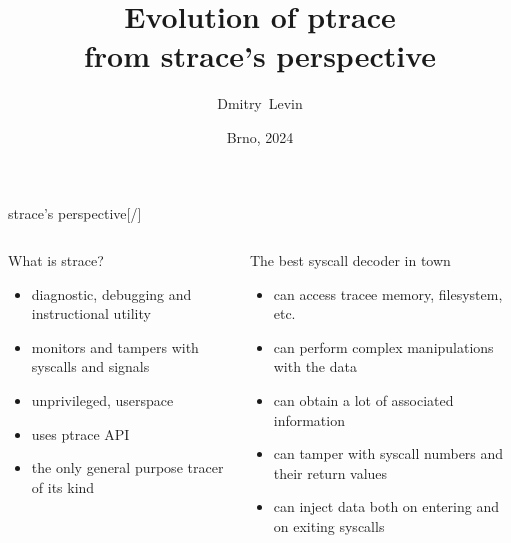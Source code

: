\documentclass[unicode,aspectratio=169,xcolor={table,dvipsnames,usernames}]{beamer}
\title{\Huge Evolution of ptrace \\ from strace's perspective}
\author{\LARGE Dmitry~Levin}
\date{\Large Brno, 2024}
\begin{document}
\begin{frame}[noframenumbering]
\titlepage
\end{frame}

{
\begin{frame}{\Large strace's perspective\hfill [\insertframenumber/\inserttotalframenumber]}
	\begin{columns}
		\column{10cm}
\begin{block}{What is strace?}
\begin{itemize}
	\item diagnostic, debugging and instructional utility
	\item monitors and tampers with syscalls and signals
	\item unprivileged, userspace
	\item uses ptrace API
	\item the only general purpose tracer of its kind
\end{itemize}
\end{block}

\begin{block}{The best syscall decoder in town}
\begin{itemize}
	\item can access tracee memory, filesystem, etc.
	\item can perform complex manipulations with the data
	\item can obtain a lot of associated information
	\item can tamper with syscall numbers and their return values
	\item can inject data both on entering and on exiting syscalls
\end{itemize}
\end{block}
		\column{2cm}
			\centerline{}
	\end{columns}
\end{frame}
}
\end{document}
